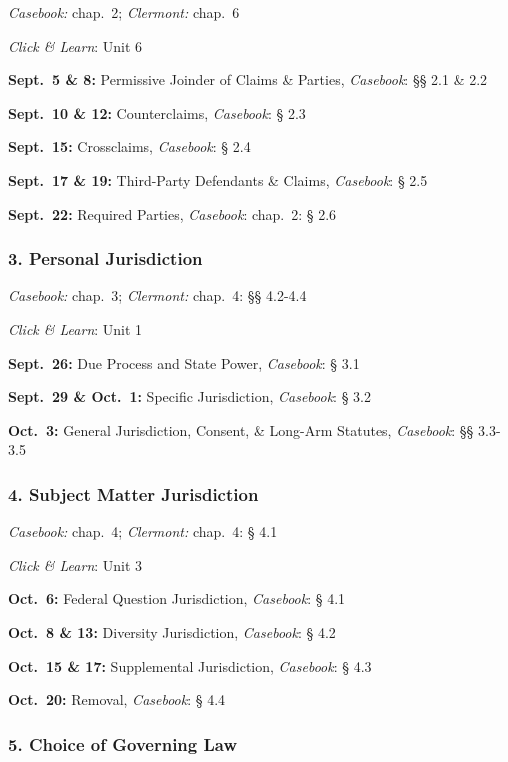 \documentclass[11pt,letterpaper,twoside]{article}
\begin{document}
\emph{Casebook:} chap.~2; \emph{Clermont:} chap.~6

\emph{Click \& Learn}: Unit 6

\textbf{Sept.~5 \& 8:} Permissive Joinder of Claims \& Parties,
\emph{Casebook}: §§ 2.1 \& 2.2

\textbf{Sept.~10 \& 12:} Counterclaims, \emph{Casebook}: § 2.3

\textbf{Sept.~15:} Crossclaims, \emph{Casebook}: § 2.4

\textbf{Sept.~17 \& 19:} Third-Party Defendants \& Claims,
\emph{Casebook}: § 2.5

\textbf{Sept.~22:} Required Parties, \emph{Casebook}: chap.~2: § 2.6

\subsubsection{3. Personal Jurisdiction}\label{personal-jurisdiction}

\emph{Casebook:} chap.~3; \emph{Clermont:} chap.~4: §§ 4.2-4.4

\emph{Click \& Learn}: Unit 1

\textbf{Sept.~26:} Due Process and State Power, \emph{Casebook}: § 3.1

\textbf{Sept.~29 \& Oct.~1:} Specific Jurisdiction, \emph{Casebook}: §
3.2

\textbf{Oct.~3:} General Jurisdiction, Consent, \& Long-Arm Statutes,
\emph{Casebook}: §§ 3.3-3.5

\subsubsection{4. Subject Matter
Jurisdiction}\label{subject-matter-jurisdiction}

\emph{Casebook:} chap.~4; \emph{Clermont:} chap.~4: § 4.1

\emph{Click \& Learn}: Unit 3

\textbf{Oct.~6:} Federal Question Jurisdiction, \emph{Casebook}: § 4.1

\textbf{Oct.~8 \& 13:} Diversity Jurisdiction, \emph{Casebook}: § 4.2

\textbf{Oct.~15 \& 17:} Supplemental Jurisdiction, \emph{Casebook}: §
4.3

\textbf{Oct.~20:} Removal, \emph{Casebook}: § 4.4

\subsubsection{5. Choice of Governing
Law}\label{choice-of-governing-law}
\end{document}

